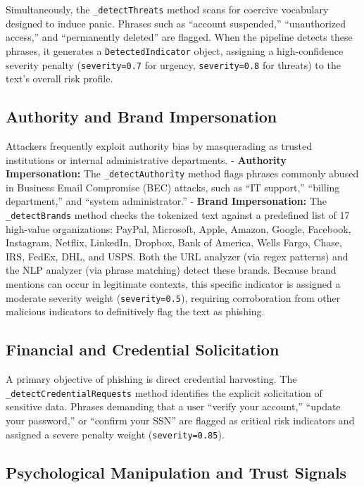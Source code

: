 Simultaneously, the \texttt{\_detectThreats} method scans for coercive
vocabulary designed to induce panic. Phrases such as ``account
suspended,'' ``unauthorized access,'' and ``permanently deleted'' are
flagged. When the pipeline detects these phrases, it generates a
\texttt{DetectedIndicator} object, assigning a high-confidence severity
penalty (\texttt{severity=0.7} for urgency, \texttt{severity=0.8} for
threats) to the text's overall risk profile.

\subsection{Authority and Brand
Impersonation}\label{authority-and-brand-impersonation}

Attackers frequently exploit authority bias by masquerading as trusted
institutions or internal administrative departments. - \textbf{Authority
Impersonation:} The \texttt{\_detectAuthority} method flags phrases
commonly abused in Business Email Compromise (BEC) attacks, such as ``IT
support,'' ``billing department,'' and ``system administrator.'' -
\textbf{Brand Impersonation:} The \texttt{\_detectBrands} method checks
the tokenized text against a predefined list of 17 high-value
organizations: PayPal, Microsoft, Apple, Amazon, Google, Facebook,
Instagram, Netflix, LinkedIn, Dropbox, Bank of America, Wells Fargo,
Chase, IRS, FedEx, DHL, and USPS. Both the URL analyzer (via regex
patterns) and the NLP analyzer (via phrase matching) detect these
brands. Because brand mentions can occur in legitimate contexts, this
specific indicator is assigned a moderate severity weight
(\texttt{severity=0.5}), requiring corroboration from other malicious
indicators to definitively flag the text as phishing.

\subsection{Financial and Credential
Solicitation}\label{financial-and-credential-solicitation}

A primary objective of phishing is direct credential harvesting. The
\texttt{\_detectCredentialRequests} method identifies the explicit
solicitation of sensitive data. Phrases demanding that a user ``verify
your account,'' ``update your password,'' or ``confirm your SSN'' are
flagged as critical risk indicators and assigned a severe penalty weight
(\texttt{severity=0.85}).

\subsection{Psychological Manipulation and Trust Signals}\label{psychological-manipulation-and-trust-signals}

